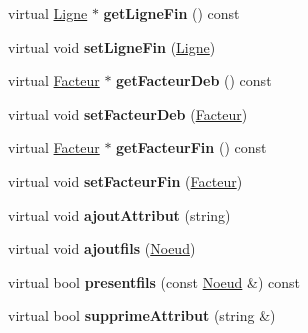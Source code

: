 \begin{DoxyCompactItemize}
\item 
\hypertarget{classNoeud_aab6e8f8deacca928d2eb1750473371e2}{
virtual \hyperlink{classLigne}{Ligne} $\ast$ {\bfseries getLigneFin} () const }
\label{classNoeud_aab6e8f8deacca928d2eb1750473371e2}

\item 
\hypertarget{classNoeud_af2bcfb224ea05a0a40f73f4a08dc9b57}{
virtual void {\bfseries setLigneFin} (\hyperlink{classLigne}{Ligne})}
\label{classNoeud_af2bcfb224ea05a0a40f73f4a08dc9b57}

\item 
\hypertarget{classNoeud_a1d1aa4242f85ec3d08c95356d12f3402}{
virtual \hyperlink{classFacteur}{Facteur} $\ast$ {\bfseries getFacteurDeb} () const }
\label{classNoeud_a1d1aa4242f85ec3d08c95356d12f3402}

\item 
\hypertarget{classNoeud_a5944312210c2fbc82cc5343cc99ee757}{
virtual void {\bfseries setFacteurDeb} (\hyperlink{classFacteur}{Facteur})}
\label{classNoeud_a5944312210c2fbc82cc5343cc99ee757}

\item 
\hypertarget{classNoeud_adfbbf10d9e0d33fb428d1bbaa6ede8e8}{
virtual \hyperlink{classFacteur}{Facteur} $\ast$ {\bfseries getFacteurFin} () const }
\label{classNoeud_adfbbf10d9e0d33fb428d1bbaa6ede8e8}

\item 
\hypertarget{classNoeud_a01a77dafeb34d9fb3c3634ced787c8fb}{
virtual void {\bfseries setFacteurFin} (\hyperlink{classFacteur}{Facteur})}
\label{classNoeud_a01a77dafeb34d9fb3c3634ced787c8fb}

\item 
\hypertarget{classNoeud_acf7f0a209baf5a30c3661facc160ba6a}{
virtual void {\bfseries ajoutAttribut} (string)}
\label{classNoeud_acf7f0a209baf5a30c3661facc160ba6a}

\item 
\hypertarget{classNoeud_a933bd62c5983aa65262fd17127a59e9d}{
virtual void {\bfseries ajoutfils} (\hyperlink{classNoeud}{Noeud})}
\label{classNoeud_a933bd62c5983aa65262fd17127a59e9d}

\item 
\hypertarget{classNoeud_a04519b75d0718f028532ae2286114f7b}{
virtual bool {\bfseries presentfils} (const \hyperlink{classNoeud}{Noeud} \&) const }
\label{classNoeud_a04519b75d0718f028532ae2286114f7b}

\item 
\hypertarget{classNoeud_a449e9a566a12cb8164963b3790fbad0a}{
virtual bool {\bfseries supprimeAttribut} (string \&)}
\label{classNoeud_a449e9a566a12cb8164963b3790fbad0a}


\end{DoxyCompactItemize}
